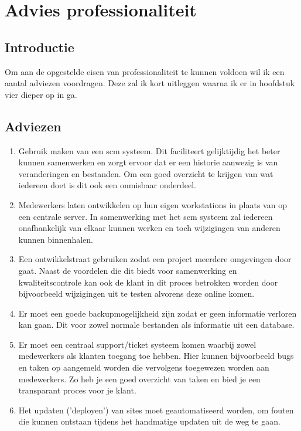 \chapter{Advies professionaliteit}

\section{Introductie}

Om aan de opgestelde eisen van professionaliteit te kunnen voldoen wil ik een aantal adviezen voordragen. Deze zal ik kort uitleggen waarna ik er in hoofdstuk vier dieper op in ga.

\section{Adviezen}

\begin{enumerate}
  \item Gebruik maken van een {\sc scm} systeem. Dit faciliteert gelijktijdig het beter kunnen samenwerken en zorgt ervoor dat er een historie aanwezig is van veranderingen en bestanden. Om een goed overzicht te krijgen van wat iedereen doet is dit ook een onmisbaar onderdeel.
  \item Medewerkers laten ontwikkelen op hun eigen workstations in plaats van op een centrale server. In samenwerking met het {\sc scm} systeem zal iedereen onafhankelijk van elkaar kunnen werken en toch wijzigingen van anderen kunnen binnenhalen.
  \item Een ontwikkelstraat gebruiken zodat een project meerdere omgevingen door gaat. Naast de voordelen die dit biedt voor samenwerking en kwaliteitscontrole kan ook de klant in dit proces betrokken worden door bijvoorbeeld wijzigingen uit te testen alvorens deze online komen.
  \item Er moet een goede backupmogelijkheid zijn zodat er geen informatie verloren kan gaan. Dit voor zowel normale bestanden als informatie uit een database.
  \item Er moet een centraal support/ticket systeem komen waarbij zowel medewerkers als klanten toegang toe hebben. Hier kunnen bijvoorbeeld bugs en taken op aangemeld worden die vervolgens toegewezen worden aan medewerkers. Zo heb je een goed overzicht van taken en bied je een transparant proces voor je klant.
  \item Het updaten ('deployen') van sites moet geautomatiseerd worden, om fouten die kunnen ontstaan tijdens het handmatige updaten uit de weg te gaan.
  
\end{enumerate}
